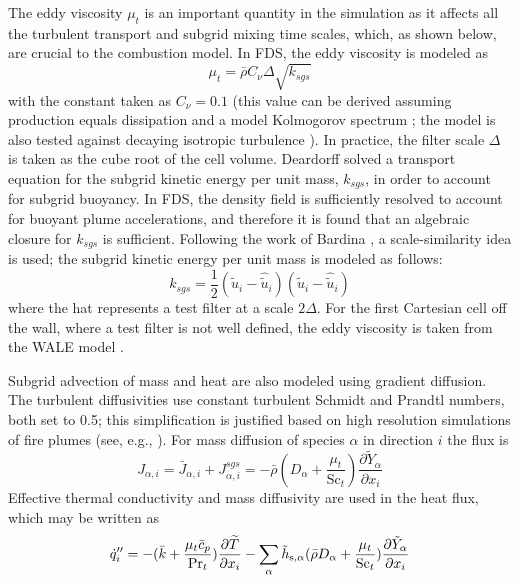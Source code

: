\documentclass[journal,article,atmosphere,submit,moreauthors,pdftex]{Definitions/mdpi}
\begin{document}
The eddy viscosity $\mu_t$ is an important quantity in the simulation as it affects all the turbulent transport and subgrid mixing time scales, which, as shown below, are crucial to the combustion model.  In FDS, the eddy viscosity is modeled as \cite{Pope:2000,Deardorff:1980}
\begin{equation}
\mu_t = \bar{\rho} C_\nu \Delta \sqrt{k_{sgs}}
\end{equation}
with the constant taken as $C_\nu = 0.1$ (this value can be derived assuming production equals dissipation and a model Kolmogorov spectrum \cite{Pope:2000}; the model is also tested against decaying isotropic turbulence \cite{CBC}).  In practice, the filter scale $\Delta$ is taken as the cube root of the cell volume.  Deardorff \cite{Deardorff:1980} solved a transport equation for the subgrid kinetic energy per unit mass, $k_{sgs}$, in order to account for subgrid buoyancy. In FDS, the density field is sufficiently resolved to account for buoyant plume accelerations, and therefore it is found that an algebraic closure for $k_{sgs}$ is sufficient.  Following the work of Bardina \cite{Bardina:1980}, a scale-similarity idea is used; the subgrid kinetic energy per unit mass is modeled as follows:
\begin{equation}
k_{sgs} = \frac{1}{2}(\tilde{u}_i - \hat{\tilde{u}}_i)(\tilde{u}_i - \hat{\tilde{u}}_i)
\end{equation}
where the hat represents a test filter at a scale $2\Delta$.  For the first Cartesian cell off the wall, where a test filter is not well defined, the eddy viscosity is taken from the WALE model \cite{Nicoud:1999}.

Subgrid advection of mass and heat are also modeled using gradient diffusion.  The turbulent diffusivities use constant turbulent Schmidt and Prandtl numbers, both set to 0.5; this simplification is justified based on high resolution simulations of fire plumes (see, e.g., \cite{Maragkos:2020}). For mass diffusion of species $\alpha$ in direction $i$ the flux is
\begin{equation}
J_{\alpha,i} = \bar{J}_{\alpha,i} + J_{\alpha,i}^{sgs} = -\bar{\rho}(D_\alpha + \frac{\mu_t}{\mathrm{Sc}_t}) \frac{\partial \tilde{Y}_\alpha}{\partial x_i}
\end{equation}
Effective thermal conductivity and mass diffusivity are used in the heat flux, which may be written as
\begin{equation}
{\dot{q}''}_i = -(\bar{k} + \frac{\mu_t \bar{c}_p}{\mathrm{Pr}_t}) \frac{\partial \widetilde{T}}{\partial x_i} - \sum_\alpha \tilde{h}_{{\rm s},\alpha} ( \bar{\rho} D_\alpha + \frac{\mu_t}{\mathrm{Sc}_t} ) \frac{\partial \tilde{Y}_\alpha }{\partial x_i}
\end{equation}
\end{document}
